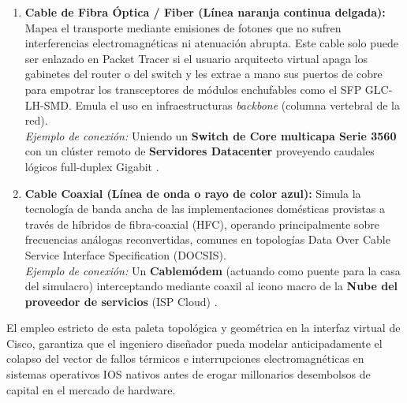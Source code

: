 \documentclass[a4paper,12pt]{article}
\begin{document}
\begin{enumerate}
    \item \textbf{Cable de Fibra Óptica / Fiber (Línea naranja continua delgada):}
    Mapea el transporte mediante emisiones de fotones que no sufren interferencias electromagnéticas ni atenuación abrupta. Este cable solo puede ser enlazado en Packet Tracer si el usuario arquitecto virtual apaga los gabinetes del router o del switch y les extrae a mano sus puertos de cobre para empotrar los transceptores de módulos enchufables como el SFP GLC-LH-SMD. Emula el uso en infraestructuras \textit{backbone} (columna vertebral de la red). \\
    \textit{Ejemplo de conexión:} Uniendo un \textbf{Switch de Core multicapa Serie 3560} con un clúster remoto de \textbf{Servidores Datacenter} proveyendo caudales lógicos full-duplex Gigabit \cite{packet_tracer_cables_guide}.

    \item \textbf{Cable Coaxial (Línea de onda o rayo de color azul):}
    Simula la tecnología de banda ancha de las implementaciones domésticas provistas a través de híbridos de fibra-coaxial (HFC), operando principalmente sobre frecuencias análogas reconvertidas, comunes en topologías Data Over Cable Service Interface Specification (DOCSIS). \\
    \textit{Ejemplo de conexión:} Un \textbf{Cablemódem} (actuando como puente para la casa del simulacro) interceptando mediante coaxil al icono macro de la \textbf{Nube del proveedor de servicios} (ISP Cloud) \cite{packet_tracer_cables_guide}.
\end{enumerate}

El empleo estricto de esta paleta topológica y geométrica en la interfaz virtual de Cisco, garantiza que el ingeniero diseñador pueda modelar anticipadamente el colapso del vector de fallos térmicos e interrupciones electromagnéticas en sistemas operativos IOS nativos antes de erogar millonarios desembolsos de capital en el mercado de hardware.
\end{document}

